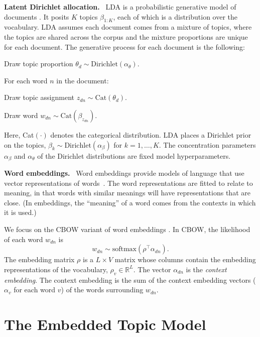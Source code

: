 \documentclass[11pt,a4paper]{article}
\DeclareRobustCommand{\parhead}[1]{\noindent\textbf{#1}~}
\begin{document}
\parhead{Latent Dirichlet allocation.}  \gls{LDA} is a probabilistic
generative model of documents \citep{blei2003latent}. It posits $K$
topics $\beta_{1:K}$, each of which is a distribution over the
vocabulary.  \gls{LDA} assumes each document comes from a mixture of
topics, where the topics are shared across the corpus and the mixture
proportions are unique for each document.  The generative process for
each document is the following:
\begin{compactenum}
\item Draw topic proportion $\theta_d \sim \textrm{Dirichlet}(\alpha_{\theta})$.
\item For each word $n$ in the document:
  \begin{compactenum}
    \setlength{\itemindent}{-0.3cm}
  \item Draw topic assignment $z_{dn} \sim \text{Cat}(\theta_d)$.
  \item Draw word $w_{dn} \sim \text{Cat}(\beta_{z_{dn}})$.
  \end{compactenum}
\end{compactenum}
Here, Cat$(\cdot)$ denotes the categorical distribution. \gls{LDA}
places a Dirichlet prior on the topics,
$\beta_k\sim \textrm{Dirichlet}(\alpha_{\beta})$ for $k=1,\ldots,K$.
The concentration parameters $\alpha_{\beta}$ and $\alpha_{\theta}$ of the
Dirichlet distributions are fixed model hyperparameters.

\parhead{Word embeddings.}  Word embeddings provide models of language
that use vector representations of
words~\citep{Rumelhart:1973,Bengio:2003}. The word representations are
fitted to relate to meaning, in that words with similar meanings will
have representations that are close.  (In embeddings, the ``meaning''
of a word comes from the contexts in which it is used.)


We focus on the \gls{CBOW} variant of word embeddings
\citep{mikolov2013distributed}. In \gls{CBOW}, the likelihood of each
word $w_{dn}$ is
\begin{equation}\label{eq:cbow}
  w_{dn} \sim \textrm{softmax}(\rho^\top \alpha_{dn}).
\end{equation}
The embedding matrix $\rho$ is a $L\times V$ matrix whose columns
contain the embedding representations of the vocabulary,
$\rho_v\in\mathbb{R}^L$. The vector $\alpha_{dn}$ is the \emph{context
  embedding}. The context embedding is the sum of the context
embedding vectors ($\alpha_v$ for each word $v$) of the words surrounding
$w_{dn}$.

 
\section{The Embedded Topic Model}
\label{sec:model}
\end{document}
